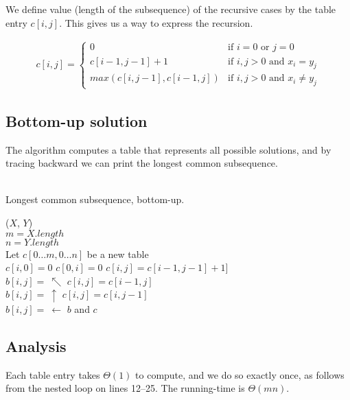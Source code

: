 We define value (length of the subsequence) of the recursive cases by the
table entry $c[i,j]$. This gives us a way to express the recursion.

\begin{align}
	c[i,j] =
	\begin{cases}
		0 & \mbox{if $i = 0$ or $j = 0$} \\
		c[i - 1, j - 1] + 1 & \mbox{if $i, j > 0$ and $x_i = y_j$} \\
		max(c[i, j-1], c[i-1, j]) & \mbox{if $i, j > 0$ and $x_i \neq y_j$}
	\end{cases}
\end{align}

\newpage
\subsection{Bottom-up solution}
The algorithm computes a table that represents all possible solutions, and
by tracing backward we can print the longest common subsequence.
\\\\
\begin{algorithm}[H]
	\caption{Longest common subsequence, bottom-up.}
	\label{alg:lcs-bottom-up}
	
	
	
	
	\BlankLine
	\LCS($X$, $Y$) \\
	\Begin
	{
		$m = X.length$ \\
		$n = Y.length$ \\
		Let $c[0 \dots m, 0 \dots n]$ be a new table \\
		{
			$c[i, 0] = 0$
		}
		{
			$c[0, i] = 0$
		}
		{
			{
				{
					$c[i, j] = c[i-1,j-1] + 1]$ \\
					$b[i, j] ={\ }\nwarrow$
				}
				{
					$c[i, j] = c[i-1, j]$ \\
					$b[i, j] ={\ }\uparrow$
				}
				\Else
				{
					$c[i, j] = c[i, j-1]$ \\
					$b[i, j] ={\ }\leftarrow$
				}
			}
		}
		\Return $b$ and $c$
	}
\end{algorithm}

\subsection{Analysis}
Each table entry takes $\Theta(1)$ to compute, and we do so exactly once, as
follows from the nested loop on lines 12--25. The running-time is $\Theta(mn)$.

